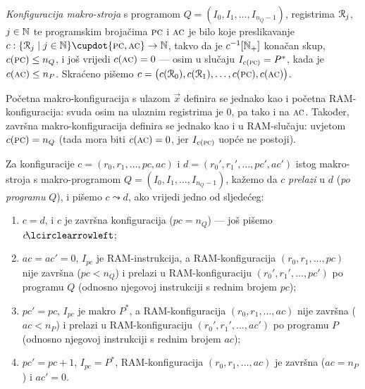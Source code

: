 \begin{definicija}[{name=[makro-konfiguracija]}]\label{def:macroconf}
\emph{Konfiguracija makro-stroja} s programom $Q=(I_0,I_1,\dotsc,I_{n_Q-1})$, registrima $\mathcal R_{j}$, $j\in{\mathbb N}$ te programskim brojačima $\textsc{pc}$ i $\textsc{ac}$ je bilo koje preslikavanje $c:\{\reg{j}\mid j\in\N\}\dcup\{\textsc{pc},\textsc{ac}\}\to\N$, takvo da je $c^{-1}[{\mathbb N}_+]$ konačan skup, $c(\textsc{pc})\le n_Q$, i još vrijedi $c(\textsc{ac})=0$ --- osim u slučaju $I_{c(\textsc{pc})}=P^*$, kada je $c(\textsc{ac})\le n_P$. Skraćeno pišemo $c=\bigl(c(\mathcal R_{0}),c(\mathcal R_{1}),\dotsc,c(\textsc{pc}),c(\textsc{ac})\bigr)$.

Početna makro-konfiguracija s ulazom $\vec x$ definira se jednako kao i početna RAM-konfiguracija: svuda osim na ulaznim registrima je $0$, pa tako i na $\textsc{ac}$. Također, završna makro-konfiguracija definira se jednako kao i u RAM-slučaju: uvjetom $c(\textsc{pc})=n_Q$ (tada mora biti $c(\textsc{ac})=0$, jer $I_{c(\textsc{pc})}$ uopće ne postoji).
\end{definicija}

\begin{definicija}[{name=[prijelazi među makro-konfiguracijama]}]\label{def:makrolead}
Za konfiguracije $c=(r_0,r_1,\dotsc,pc,ac)$ i $d=(r_0',r_1',\dotsc,pc',ac')$ istog makro-stroja s makro-programom $Q=(I_0,I_1,\dotsc,I_{n_Q-1})$, kažemo da $c$ \emph{prelazi} u $d$ (\emph{po programu} $Q$), i pišemo $c\leadsto d$, ako vrijedi jedno od sljedećeg:
\begin{enumerate}
    \item\label{stav:zav} $c=d$, i $c$ je završna konfiguracija ($pc=n_Q$) --- još pišemo $c\!\lcirclearrowleft$;
    \item\label{stav:Q} $ac=ac'=0$, $I_{pc}$ je RAM-instrukcija, a RAM-konfiguracija $(r_0,r_1,\dotsc,pc)$ nije završna ($pc<n_Q$) i prelazi u RAM-konfiguraciju $(r_0',r_1',\dotsc,pc')$ po programu $Q$ (odnosno njegovoj instrukciji s rednim brojem $pc$);
    \item\label{stav:P} $pc'=pc$, $I_{pc}$ je makro $P^*$, a RAM-konfiguracija $(r_0,r_1,\dotsc,ac)$ nije završna ($ac<n_P$) i prelazi u RAM-konfiguraciju $(r_0',r_1',\dotsc,ac')$ po programu $P$ (odnosno njegovoj instrukciji s rednim brojem $ac$);
    \item\label{stav:carry} $pc'=pc+1$, $I_{pc}=P^*$, RAM-konfiguracija $(r_0,r_1,\dotsc,ac)$ je završna ($ac=n_P$) i $ac'=0$.\qedhere
\end{enumerate}
\end{definicija}

